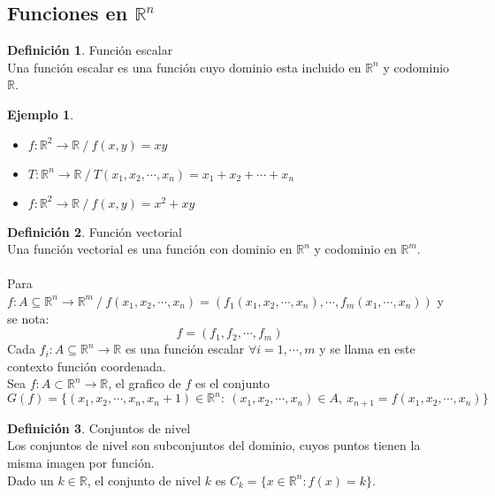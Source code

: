\documentclass[10pt]{article}
\theoremstyle{definition}
\newtheorem{definition}{Definición}[section]
\newtheorem{example}{Ejemplo}[section]
\begin{document}
\subsection{Funciones en $\mathbb{R}^n$}
\begin{definition}{Función escalar}
	\\Una función escalar es una función cuyo dominio esta incluido en $\mathbb{R}^n$ y codominio $\mathbb{R}$.
\end{definition}
\begin{example}{ \ }
    \begin{itemize}
        \item $f:\mathbb{R}^2\to\mathbb{R}\ /\ f(x,y)=xy$
        \item $T:\mathbb{R}^n\to\mathbb{R}\ /\ T(x_1,x_2,\cdots,x_n)=x_1+x_2+\cdots+x_n$
        \item $f:\mathbb{R}^2\to\mathbb{R}\ /\ f(x,y)=x^2+xy$
    \end{itemize}
\end{example}
\begin{definition}{Función vectorial}
	\\Una función vectorial es una función con dominio en $\mathbb{R}^n$ y codominio en $\mathbb{R}^m$.\\
    \\Para $f:A\subseteq\mathbb{R}^n\to\mathbb{R}^m\ /\ f(x_1,x_2,\cdots,x_n)=(f_1(x_1,x_2,\cdots,x_n),\cdots,f_m(x_1,\cdots,x_n))$ y se nota: $$f=(f_1,f_2,\cdots,f_m)$$
Cada $f_i:A\subseteq\mathbb{R}^n\to\mathbb{R}$ es una función escalar $\forall i=1,\cdots,m$ y se llama en este contexto función coordenada.
\\Sea $f:A\subset\mathbb{R}^n\to\mathbb{R}$, el grafico de $f$ es el conjunto $$G(f)=\{(x_1,x_2,\cdots,x_n,x_n+1)\in\mathbb{R}^n:\ (x_1,x_2,\cdots,x_n)\in A,\ x_{n+1}=f(x_1,x_2,\cdots,x_n)\}$$
\end{definition}
\begin{definition}{Conjuntos de nivel}
    \\Los conjuntos de nivel son subconjuntos del dominio, cuyos puntos tienen la misma imagen por función.
    \\Dado un $k\in\mathbb{R}$, el conjunto de nivel $k$ es $C_k=\{x\in\mathbb{R}^n : f(x)=k\}$.
\end{definition}
\end{document}
